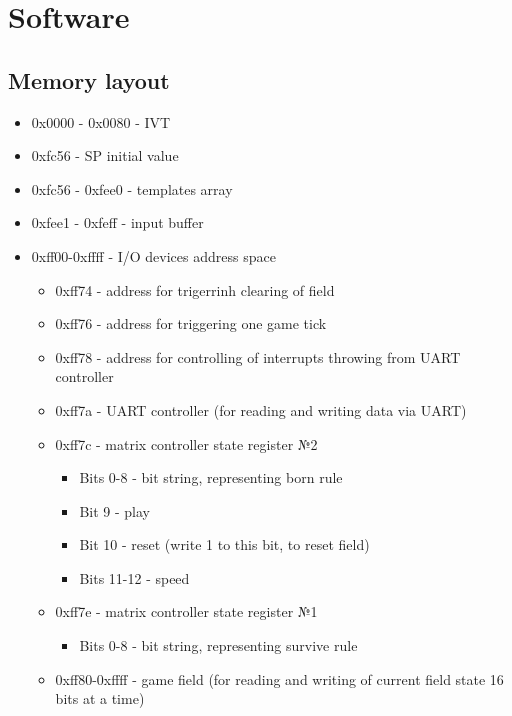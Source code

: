 \chapter*{Software}

\section*{Memory layout}

\begin{itemize}
	\item 0x0000 - 0x0080 - IVT
	\item 0xfc56 - SP initial value
	\item 0xfc56 - 0xfee0 - templates array 
	\item 0xfee1 - 0xfeff - input buffer 
	\item 0xff00-0xffff - I/O devices address space \begin{itemize}
		\item 0xff74 - address for trigerrinh clearing of field
		\item 0xff76 - address for triggering one game tick
		\item 0xff78 - address for controlling of interrupts throwing from UART controller
		\item 0xff7a - UART controller (for reading and writing data via UART) 
		\item 0xff7c - matrix controller state register №2 \begin{itemize}
				\item Bits 0-8 - bit string, representing born rule
				\item Bit 9 - play
				\item Bit 10 - reset (write 1 to this bit, to reset field)
				\item Bits 11-12 - speed
		\end{itemize}
		\item 0xff7e - matrix controller state register №1 \begin{itemize}
				\item Bits 0-8 - bit string, representing survive rule
		\end{itemize}
		\item 0xff80-0xffff - game field (for reading and writing of current field state 16 bits at a time) 
	\end{itemize}
\end{itemize}

